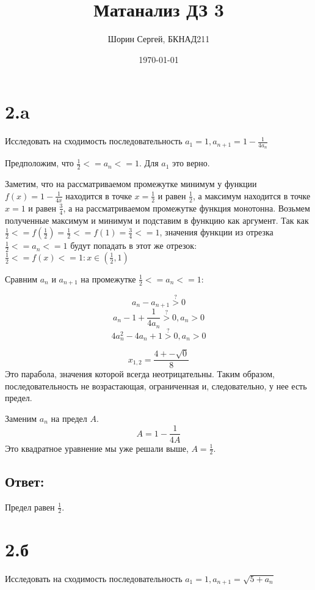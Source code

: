 \documentclass[a4paper]{article}
\author{Шорин Сергей, БКНАД211}
\title{Матанализ ДЗ 3}
\date{\today}
\begin{document}
\maketitle



\section*{2.a}
Исследовать на сходимость последовательность $ a_1 = 1, a_{n+1}  = 1 - \frac{1}{4a_n}$

Предположим, что $ \frac{1}{2} <= a_n <= 1$. Для $a_1$ это верно.

Заметим, что на рассматриваемом промежутке минимум у функции  $ f(x) = 1 - \frac{1}{4x}$ находится в точке $x = \frac{1}{2}$ и равен $\frac{1}{2}$, а максимум находится в точке $x = 1$ и равен $\frac{3}{4}$, а на рассматриваемом промежутке функция монотонна. Возьмем полученные максимум и минимум и подставим в функцию как аргумент. Так как 
$\frac{1}{2} <= f(\frac{1}{2}) = \frac{1}{2} <= f(1) = \frac{3}{4} <= 1$, значения функции из отрезка $ \frac{1}{2} <= a_n <= 1$ будут попадать в этот же  отрезок: $ \frac{1}{2} <=  f(x) <= 1 : x \in (\frac{1}{2}, 1)$

Сравним $a_n$ и $a_{n+1}$ на промежутке $ \frac{1}{2} <=  a_n <= 1$:

$$ a_n - a_{n+1} \overset{?}{>} 0$$
$$ a_n - 1 + \frac{1}{4a_n} \overset{?}{>} 0,  a_n > 0$$
$$ 4a_n^2 - 4a_n + 1 \overset{?}{>} 0,  a_n > 0$$


$$x_{1, 2} = \frac{4 +- \sqrt{0}}{8}  $$
Это парабола, значения которой всегда неотрицательны. Таким образом, последовательность не возрастающая, ограниченная и, следовательно, у нее есть предел.

Заменим $a_n$ на предел $A$.
$$A  = 1 - \frac{1}{4A}$$
Это квадратное уравнение мы уже решали выше, $A = \frac{1}{2}$.

\subsection*{Ответ:}
Предел равен $\frac{1}{2}$.







\section*{2.б}
Исследовать на сходимость последовательность $ a_1 = 1, a_{n+1}  = \sqrt{5 + a_n}$
\end{document}
